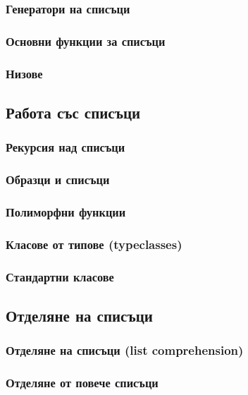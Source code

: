 \documentclass{beamer}
\begin{document}
\begin{frame}
  \frametitle{Генератори на списъци}
  
\end{frame}

\begin{frame}
  \frametitle{Основни функции за списъци}
\end{frame}

\begin{frame}
  \frametitle{Низове}
  
\end{frame}

\subsection{Работа със списъци}

\begin{frame}
  \frametitle{Рекурсия над списъци}
\end{frame}

\begin{frame}
  \frametitle{Образци и списъци}
  
\end{frame}

\begin{frame}
  \frametitle{Полиморфни функции}
\end{frame}

\begin{frame}
  \frametitle{Класове от типове (typeclasses)}
  
\end{frame}

\begin{frame}
  \frametitle{Стандартни класове}
  
\end{frame}

\subsection{Отделяне на списъци}

\begin{frame}
  \frametitle{Отделяне на списъци (list comprehension)}
  
\end{frame}

\begin{frame}
  \frametitle{Отделяне от повече списъци}
  
\end{frame}
\end{document}
